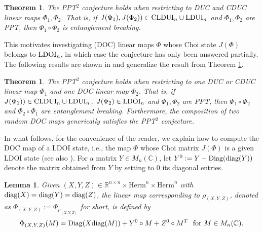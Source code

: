 \documentclass[11pt]{article}
\newcommand{\R}{\ensuremath{\mathbb{R}}}   %
\newcommand{\C}{\ensuremath{\mathbb{C}}} %
\newcommand{\Herm}{\mathrm{Herm}}
\newcommand{\CLDUI}{\text{\rm CLDUI}}
\newcommand{\LDUI}{\text{\rm LDUI}}
\newcommand{\LDOI}{\text{\rm LDOI}}
\newcommand{\diag}{\text{\rm diag}}
\newcommand{\Diag}{\text{\rm Diag}}
\theoremstyle{plain}
\newtheorem{lemma}[satz]{Lemma}
\newtheorem{theorem}[satz]{Theorem}
\begin{document}
\begin{theorem}\cite[Theorem 4.5]{Singh-Nechita-PPT2}\label{theo:PPT2CLDUI}  The PPT$^2$ conjecture holds when restricting to DUC and CDUC linear maps $\Phi_1,\Phi_2$. That is, if  $J(\Phi_1),J(\Phi_2))\in \CLDUI_n \cup \LDUI_n$ and $\Phi_1,\Phi_2$ are PPT,  then $\Phi_1\circ \Phi_2$ is entanglement breaking. 
\end{theorem}

This motivates investigating (DOC) linear maps $\Phi$ whose Choi state $J(\Phi)$ belongs to $\LDOI_n$, in which case the conjecture has only been answered partially. The following results are shown in \cite[Corollary 6.4, Theorem 6.5]{Nechita-Park_2025} and generalize the result from Theorem \ref{theo:PPT2CLDUI}.

\begin{theorem}
    The PPT$^2$ conjecture holds when restricting to one DUC or CDUC linear map $\Phi_1$ and one DOC linear map $\Phi_2$. That is, if  $J(\Phi_1))\in \CLDUI_n \cup \LDUI_n$,  $J(\Phi_2)\in\LDOI_n$ and $\Phi_1,\Phi_2$ are PPT, then $\Phi_1\circ \Phi_2$ and $\Phi_2\circ \Phi_1$ are entanglement breaking.
    Furthermore, the composition of two random DOC maps generically satisfies the PPT$^2$ conjecture.
\end{theorem}

In what follows,  for the convenience of the reader, we explain  how to compute the DOC map of a LDOI state, i.e., the map $\Phi$ whose Choi matrix $J(\Phi)$ is a given LDOI state (see also  \cite[Lemma~9.3]{SN-CLDUI}).
For a matrix $Y\in M_n(\C)$, let $Y^0:=Y-\Diag(\diag(Y))$ denote the matrix obtained from $Y$ by setting to 0 its diagonal entries.


\begin{lemma}\label{lem:computePhi}
    Given $(X,Y,Z)\in\R^{n\times n}\times\Herm^n\times\Herm^n$ with $\diag(X)=\diag(Y)=\diag(Z)$, the  linear map corresponding  to $\rho_{(X,Y,Z)}$, denoted as $\Phi_{(X,Y,Z)}:=\Phi_{\rho_{(X,Y,Z)}}$ for short,    is defined by 
    $$\Phi_{(X,Y,Z)}(M)=\Diag(X\diag(M))+Y^{0}\circ M + Z^{0}\circ M^T\ \text { for } M\in M_n(\C).$$
\end{lemma}
\end{document}
